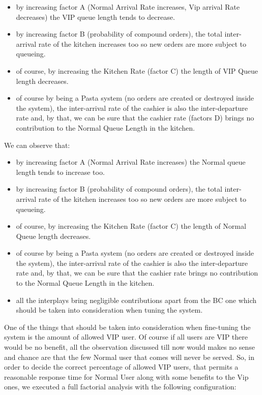 {{%

\begin{itemize}
    \item by increasing factor A (Normal Arrival Rate increases, Vip arrival Rate decreases) the VIP queue length tends to decrease.
    \item by increasing factor B (probability of compound orders), the total inter-arrival rate of the kitchen increases too so new orders are more subject to queueing.
    \item of course, by increasing the Kitchen Rate (factor C) the length of VIP Queue length decreases.
    \item of course by being a Pasta system (no orders are created or destroyed inside the system), the inter-arrival rate of the cashier is also the inter-departure rate and, by that, we can be sure that the cashier rate (factors D) brings no contribution to the Normal Queue Length in the kitchen. %
\end{itemize}


We can observe that:
\begin{itemize}
    \item by increasing factor A (Normal Arrival Rate increases) the Normal queue length tends to increase too.
    \item by increasing factor B (probability of compound orders), the total inter-arrival rate of the kitchen increases too so new orders are more subject to queueing.
    \item of course, by increasing the Kitchen Rate (factor C) the length of Normal Queue length decreases.
    \item of course by being a Pasta system (no orders are created or destroyed inside the system), the inter-arrival rate of the cashier is also the inter-departure rate and, by that, we can be sure that the cashier rate brings no contribution to the Normal Queue Length in the kitchen. %
    \item all the interplays bring negligible contributions apart from the BC one which should be taken into consideration when tuning the system. %
\end{itemize}


One of the things that should be taken into consideration when fine-tuning the system is the amount of allowed VIP user. Of course if all users are VIP there would be no benefit, all the observation discussed till now would makes no sense and chance are that the few Normal user that comes will never be served. So, in order to decide the correct percentage of allowed VIP users, that permits a reasonable response time for Normal User along with some benefits to the Vip ones, we executed a full factorial analysis with the following configuration:
 
}}

